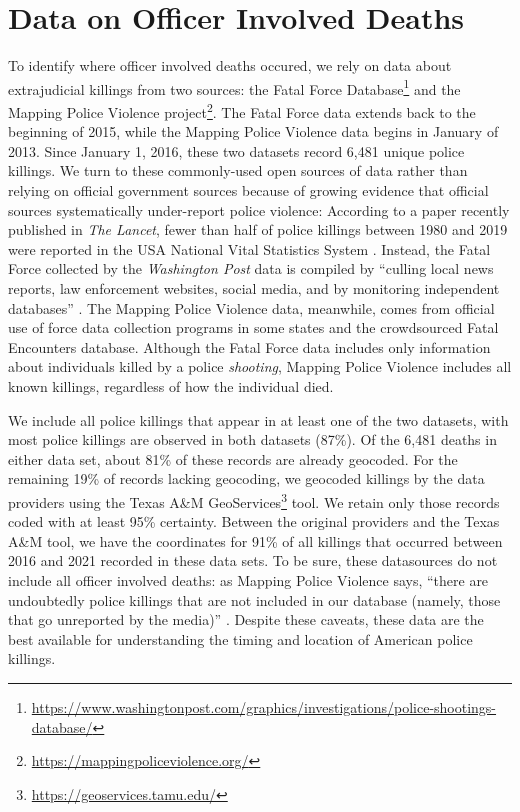 \documentclass[12pt]{article}
\begin{document}
\section*{Data on Officer Involved Deaths}
To identify where officer involved deaths occured, 
we rely on data about extrajudicial killings from two sources: the  Fatal Force Database\footnote{\url{https://www.washingtonpost.com/graphics/investigations/police-shootings-database/}} and the Mapping Police Violence project\footnote{\url{https://mappingpoliceviolence.org/}}. The Fatal Force data extends back to the beginning of 2015, while the Mapping Police Violence data begins in January of 2013. Since January 1, 2016, these two datasets record 6,481 unique police killings. We turn to these commonly-used open sources of data rather than relying on official government sources because of growing evidence that official sources systematically under-report police violence: According to a paper recently published in \textit{The Lancet}, fewer than half of police killings between 1980 and 2019 were reported in the USA National Vital Statistics System \citep{GBD2019PoliceViolenceSubnationalCollaborators2021}. Instead, the Fatal Force collected by the \textit{Washington Post} data is compiled by ``culling local news reports, law enforcement websites, social media, and by monitoring independent databases'' \citep{Tate2016}. The Mapping Police Violence data, meanwhile, comes from official use of force data collection programs in some states and the crowdsourced Fatal Encounters database. Although the Fatal Force data includes only information about individuals killed by a police \textit{shooting}, Mapping Police Violence includes all known killings, regardless of how the individual died.

We include all police killings that appear in at least one of the two datasets, with most police killings are observed in both datasets (87\%). Of the 6,481 deaths in either data set, about 81\% of these records are already geocoded. For the remaining 19\% of records lacking geocoding, 
we geocoded killings by the data providers using the Texas A&M GeoServices\footnote{\url{https://geoservices.tamu.edu/}} tool. We retain only those records coded with at least 95\% certainty. Between the original providers and the Texas A&M tool, we have the coordinates for 91\% of all killings that occurred between 2016 and 2021 recorded in these data sets. To be sure, these datasources do not include all officer involved deaths: as Mapping Police Violence says, ``there are undoubtedly police killings that are not included in our database (namely, those that go unreported by the media)'' \citep{MPV}. Despite these caveats, these data are the best available for understanding the timing and location of American police killings.
\end{document}
